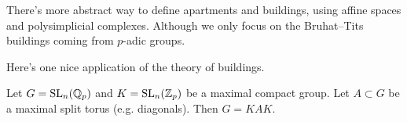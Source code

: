 


There's more abstract way to define apartments and buildings, using affine spaces and polysimplicial complexes.
Although we only focus on the Bruhat--Tits buildings coming from $p$-adic groups.

Here's one nice application of the theory of buildings.

\begin{theorem}
Let $G = \mathrm{SL}_n(\mathbb{Q}_p)$ and $K = \mathrm{SL}_n(\mathbb{Z}_p)$ be a maximal compact group.
Let $A \subset G$ be a maximal split torus (e.g. diagonals).
Then $G = KAK$.
\end{theorem}

